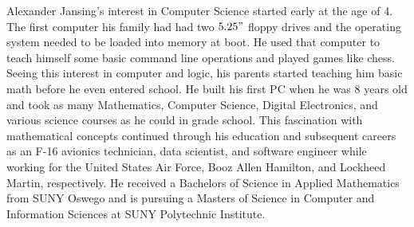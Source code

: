 \begin{vita}

Alexander Jansing's interest in Computer Science started early at the age of 4. The first computer his family had had two $5.25"$ floppy drives and the operating system needed to be loaded into memory at boot. He used that computer to teach himself some basic command line operations and played games like chess. Seeing this interest in computer and logic, his parents started teaching him basic math before he even entered school. He built his first PC when he was 8 years old and took as many Mathematics, Computer Science, Digital Electronics, and various science courses as he could in grade school. This fascination with mathematical concepts continued through his education and subsequent careers as an F-16 avionics technician, data scientist, and software engineer while working for the United States Air Force, Booz Allen Hamilton, and Lockheed Martin, respectively. He received a Bachelors of Science in Applied Mathematics from SUNY Oswego and is pursuing a Masters of Science in Computer and Information Sciences at SUNY Polytechnic Institute.
\end{vita}
